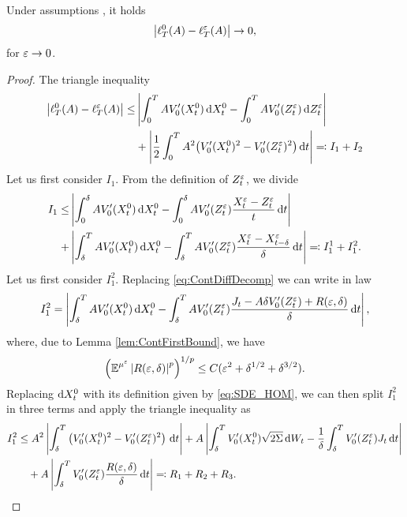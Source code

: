 \documentclass[10pt]{article}
\begin{document}
\begin{lemma} Under assumptions , it holds
	\begin{equation}
		\left\lvert\ell_T^0(A) - \ell_T^\varepsilon(A)\right\rvert \to 0,
	\end{equation}
	for $\varepsilon \to 0$.
\end{lemma}

\begin{proof} The triangle inequality
	\begin{equation}
	\begin{aligned}
		\left\lvert\ell_T^0(A) - \ell_T^\varepsilon(A)\right\rvert \leq &\left\lvert\int_0^T A V_0'(X_t^0) \,\mathrm{d} X_t^0 - \int_0^T A V_0'(Z^\varepsilon_t) \,\mathrm{d} Z^\varepsilon_t\right\rvert \\
		&+ \left\lvert\frac12 \int_0^T A^2 \big(V_0'(X_t^0)^2 - V_0'(Z^\varepsilon_t)^2\big) \,\mathrm{d} t\right\rvert \eqqcolon I_1 + I_2
	\end{aligned}
	\end{equation}
	Let us first consider $I_1$. From the definition of $Z_t^\varepsilon$, we divide
	\begin{equation}
	\begin{aligned}
		 I_1 \leq &\left\lvert\int_0^\delta A V_0'(X_t^0) \,\mathrm{d} X_t^0 - \int_0^\delta A V_0'(Z^\varepsilon_t) \frac{X^\varepsilon_t - Z^\varepsilon_t}{t}\,\mathrm{d} t\right\rvert\\
		 + &\left\lvert\int_\delta^T A V_0'(X_t^0) \,\mathrm{d} X_t^0 - \int_\delta^T A V_0'(Z^\varepsilon_t) \frac{X^\varepsilon_t - X^\varepsilon_{t-\delta}}{\delta}\,\mathrm{d} t\right\rvert \eqqcolon I_1^1 + I_1^2.
	\end{aligned} 
	\end{equation}
	Let us first consider $I_1^2$. Replacing \eqref{eq:ContDiffDecomp} we can write in law
	\begin{equation}
		I_1^2 = \left\lvert\int_\delta^T A V_0'(X_t^0) \,\mathrm{d} X_t^0 - \int_\delta^T A V_0'(Z^\varepsilon_t) \frac{J_t - A\delta V_0'(Z_t^\varepsilon) + R(\varepsilon, \delta)}{\delta}\,\mathrm{d} t\right\rvert,
	\end{equation}
	where, due to Lemma \ref{lem:ContFirstBound}, we have
	\begin{equation}
		\left( \operatorname{\mathbb{E}}^{\mu^\varepsilon} \left\lvert R(\varepsilon, \delta)\right\rvert^p \right)^{1/p} \leq C(\varepsilon^2 + \delta^{1/2} + \delta^{3/2}).
	\end{equation}
	Replacing $\mathrm{d} X^0_t$ with its definition given by \eqref{eq:SDE_HOM}, we can then split $I_1^2$ in three terms and apply the triangle inequality as
	\begin{equation}
	\begin{aligned}
		I_1^2 &\leq A^2 \left\lvert\int_\delta^T  \left(V_0'(X_t^0)^2 - V_0'(Z_t^\varepsilon)^2\right) \,\mathrm{d} t\right\rvert + A \left\lvert\int_\delta^T  V_0'(X^0_t)\sqrt{2\Sigma}\,\mathrm{d} W_t - \frac{1}{\delta} \int_\delta^T V_0'(Z_t^\varepsilon) J_t \,\mathrm{d} t\right\rvert \\
		&\quad+ A \left\lvert\int_\delta^T V_0'(Z_t^\varepsilon) \frac{R(\varepsilon, \delta)}{\delta}\,\mathrm{d} t\right\rvert \eqqcolon R_1 + R_2 + R_3.
	\end{aligned}
	\end{equation}	
\end{proof}
\end{document}
